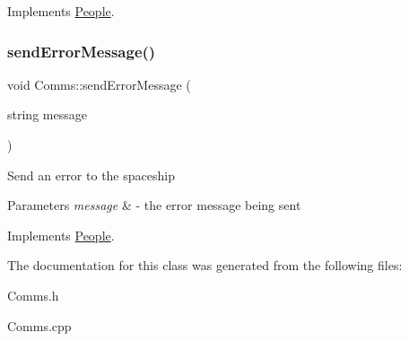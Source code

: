Implements \hyperlink{classPeople_a0685df78be631783138865e03cc7c85d}{People}.

\mbox{\label{classComms_a23c37f6d10f06c7cfe25c4dc7d62fa12}} 
\subsubsection{\texorpdfstring{send\+Error\+Message()}{sendErrorMessage()}}
{\footnotesize\ttfamily void Comms\+::send\+Error\+Message (\begin{DoxyParamCaption}\item[{string}]{message }\end{DoxyParamCaption})\hspace{0.3cm}{\ttfamily [virtual]}}

Send an error to the spaceship 
\begin{DoxyParams}{Parameters}
{\em message} & -\/ the error message being sent \\
\hline
\end{DoxyParams}


Implements \hyperlink{classPeople_a572a35170f61d1848eb04b65baafb057}{People}.



The documentation for this class was generated from the following files\+:\begin{DoxyCompactItemize}
\item 
Comms.\+h\item 
Comms.\+cpp\end{DoxyCompactItemize}
